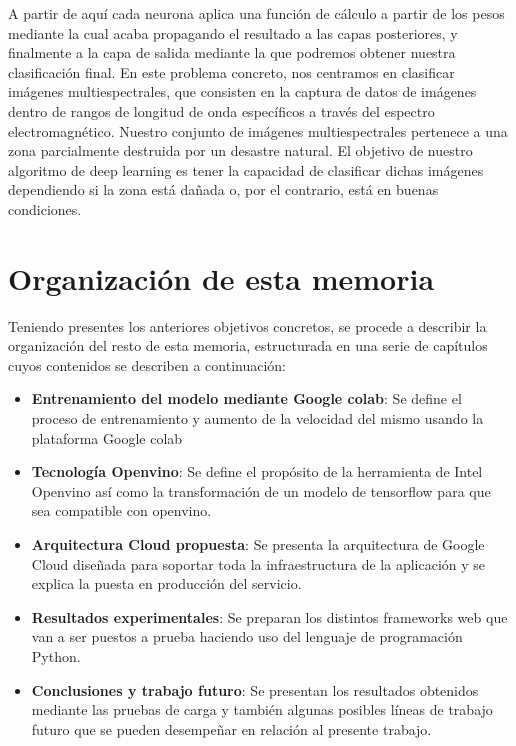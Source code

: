A partir de aquí cada neurona aplica una función de cálculo a partir de los pesos mediante la cual acaba propagando el resultado a las capas posteriores, y
finalmente a la capa de salida mediante la que podremos obtener nuestra clasificación final.
En este problema concreto, nos centramos en clasificar imágenes multiespectrales,
que consisten en la captura de datos de imágenes dentro de rangos de longitud de onda específicos a través del espectro electromagnético.
Nuestro conjunto de imágenes multiespectrales pertenece a una zona parcialmente destruida por un desastre natural.
El objetivo de nuestro algoritmo de deep learning es tener la capacidad de clasificar dichas imágenes dependiendo si la zona está dañada o,
por el contrario, está en buenas condiciones.


\section{Organización de esta memoria}\label{sec:organización-de-esta-memoria}

Teniendo presentes los anteriores objetivos concretos, se procede a describir la organización del resto de esta memoria, estructurada en una serie de capítulos cuyos contenidos se
describen a continuación:

\begin{itemize}
    \item \textbf{Entrenamiento del modelo mediante Google colab}: Se define el proceso de entrenamiento y aumento de la velocidad del mismo usando la plataforma Google colab
    \item \textbf{Tecnología Openvino}: Se define el propósito de la herramienta de Intel Openvino así como la transformación de un modelo de tensorflow para que sea compatible con openvino.
    \item \textbf{Arquitectura Cloud propuesta}: Se presenta la arquitectura de Google Cloud diseñada para soportar toda la infraestructura de la aplicación y se explica la puesta en producción del servicio.
    \item \textbf{Resultados experimentales}: Se preparan los distintos frameworks web que van a ser puestos a prueba haciendo uso del lenguaje de programación Python.
    \item \textbf{Conclusiones y trabajo futuro}: Se presentan los resultados obtenidos mediante las pruebas de carga y también algunas posibles líneas de trabajo futuro que se pueden desempeñar en relación al presente trabajo.
\end{itemize}